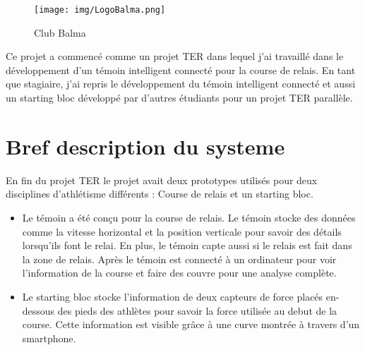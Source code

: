 \documentclass[12pt]{article}
\begin{document}
\begin{figure}[!htb]
\centering
\texttt{[image: img/LogoBalma.png]}
\caption{Club Balma}
\label{img:LogoBalma}
\end{figure}

Ce projet a commencé comme un projet TER dans lequel j'ai travaillé dans le développement d'un témoin intelligent connecté pour la course de relais. En tant que stagiaire, j'ai repris le développement du témoin intelligent connecté et aussi un starting bloc développé par d'autres étudiants pour un projet TER parallèle.


\section{Bref description du systeme}
En fin du projet TER le projet avait deux prototypes utilisés pour deux disciplines d'athlétisme différents : Course de relais et un starting bloc.

\begin{itemize}
	\item Le témoin a été conçu pour la course de relais. Le témoin stocke 	des données comme la vitesse horizontal et la  position verticale pour 	savoir des détails lorsqu'ils font le relai.	En plus, le témoin capte aussi si le relais est fait 	dans la zone de relais. Après le témoin est connecté à un 	ordinateur pour voir l'information de la course et faire des 	couvre pour une analyse complète. 

	\item Le starting bloc stocke l'information de deux capteurs de force placés en-dessous des pieds des athlètes pour savoir la force utilisée au debut de la course. Cette information est visible grâce à une curve montrée à travers d'un smartphone.
\end{itemize}
\end{document}
